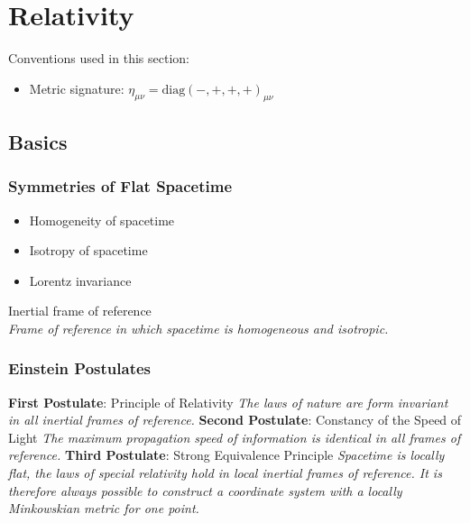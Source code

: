 \section{Relativity}
	Conventions used in this section:
	\begin{itemize}
		\item Metric signature: $\eta_{\mu\nu} = \mathrm{diag}(-,+,+,+)_{\mu\nu}$
	\end{itemize}
	\subsection{Basics}
		\subsubsection{Symmetries of Flat Spacetime}
			\begin{itemize}
				\item Homogeneity of spacetime
				\item Isotropy of spacetime
				\item Lorentz invariance
			\end{itemize}

			\noindent
			Inertial frame of reference \\
			\indent \textit{Frame of reference in which spacetime is homogeneous and isotropic.}

		\subsubsection{Einstein Postulates}
			\textbf{First Postulate}: Principle of Relativity \newline
			\indent \textit{The laws of nature are form invariant in all inertial frames of reference.}  \nl
			\textbf{Second Postulate}: Constancy of the Speed of Light \newline
			\indent \textit{The maximum propagation speed of information is identical in all frames of reference.}
			\label{post:c}\nl
			\textbf{Third Postulate}: Strong Equivalence Principle \newline
			\indent \textit{Spacetime is locally flat, \ie the laws of special relativity hold in local inertial frames of reference. It is therefore always possible to construct a coordinate system with a locally Minkowskian metric for one point.}  \vsp

